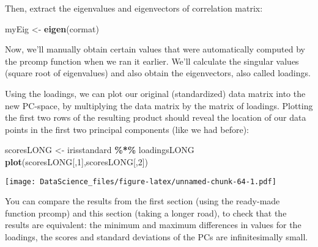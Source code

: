 \documentclass[
]{book}
\newenvironment{Shaded}{\begin{snugshade}}{\end{snugshade}}
\newcommand{\DecValTok}[1]{\textcolor[rgb]{0.00,0.00,0.81}{#1}}
\newcommand{\KeywordTok}[1]{\textcolor[rgb]{0.13,0.29,0.53}{\textbf{#1}}}
\newcommand{\NormalTok}[1]{#1}
\newcommand{\OperatorTok}[1]{\textcolor[rgb]{0.81,0.36,0.00}{\textbf{#1}}}
\newcommand{\StringTok}[1]{\textcolor[rgb]{0.31,0.60,0.02}{#1}}
\begin{document}
Then, extract the eigenvalues and eigenvectors of correlation matrix:

\begin{Shaded}
\begin{Highlighting}[]
\NormalTok{myEig \textless{}{-}}\StringTok{ }\KeywordTok{eigen}\NormalTok{(cormat)}
\end{Highlighting}
\end{Shaded}

Now, we'll manually obtain certain values that were automatically computed by the prcomp function when we ran it earlier. We'll calculate the singular values (square root of eigenvalues) and also obtain the eigenvectors, also called loadings.

\begin{Shaded}
\end{Shaded}

Using the loadings, we can plot our original (standardized) data matrix into the new PC-space, by multiplying the data matrix by the matrix of loadings. Plotting the first two rows of the resulting product should reveal the location of our data points in the first two principal components (like we had before):

\begin{Shaded}
\begin{Highlighting}[]
\NormalTok{scoresLONG \textless{}{-}}\StringTok{ }\NormalTok{irisstandard }\OperatorTok{\%*\%}\StringTok{ }\NormalTok{loadingsLONG}
\KeywordTok{plot}\NormalTok{(scoresLONG[,}\DecValTok{1}\NormalTok{],scoresLONG[,}\DecValTok{2}\NormalTok{])}
\end{Highlighting}
\end{Shaded}

\texttt{[image: DataScience\_files/figure-latex/unnamed-chunk-64-1.pdf]}

You can compare the results from the first section (using the ready-made function prcomp) and this section (taking a longer road), to check that the results are equivalent: the minimum and maximum differences in values for the loadings, the scores and standard deviations of the PCs are infinitesimally small.
\end{document}
